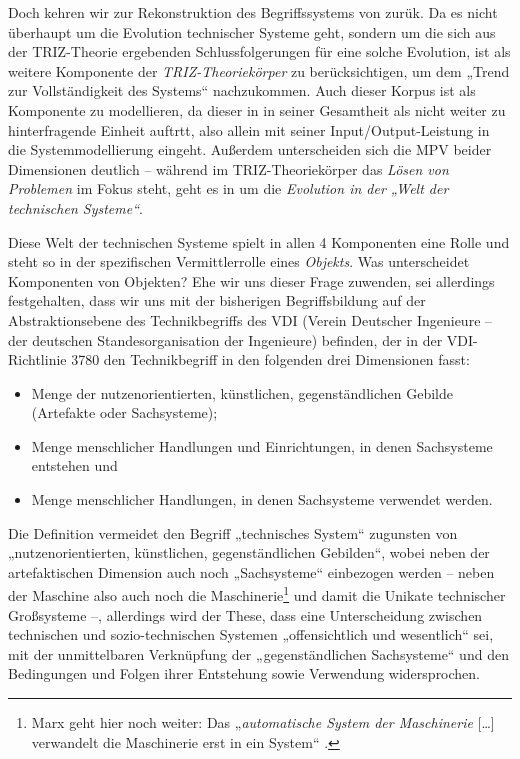 \documentclass[11pt,a4paper]{article}
\begin{document}
Doch kehren wir zur Rekonstruktion des Begriffssystems von \cite{TESE2018}
zurük.  Da es nicht überhaupt um die Evolution technischer Systeme geht,
sondern um die sich aus der TRIZ-Theorie ergebenden Schlussfolgerungen für
eine solche Evolution, ist als weitere Komponente der
\emph{TRIZ-Theoriekörper} zu berücksichtigen, um dem „Trend zur
Vollständigkeit des Systems“ nachzukommen.  Auch dieser Korpus ist als
Komponente zu modellieren, da dieser in \cite{TESE2018} in seiner Gesamtheit
als nicht weiter zu hinterfragende Einheit auftrtt, also allein mit seiner
Input/Output-Leistung in die Systemmodellierung eingeht.  Außerdem
unterscheiden sich die MPV beider Dimensionen deutlich -- während im
TRIZ-Theoriekörper das \emph{Lösen von Problemen} im Fokus steht, geht es in
\cite{TESE2018} um die \emph{Evolution in der „Welt der technischen Systeme“}.

Diese Welt der technischen Systeme spielt in allen 4 Komponenten eine Rolle
und steht so in der spezifischen Vermittlerrolle eines \emph{Objekts}.  Was
unterscheidet Komponenten von Objekten? Ehe wir uns dieser Frage zuwenden, sei
allerdings festgehalten, dass wir uns mit der bisherigen Begriffsbildung auf
der Abstraktionsebene des Technikbegriffs des VDI (Verein Deutscher Ingenieure
-- der deutschen Standesorganisation der Ingenieure) befinden, der in der
VDI-Richtlinie 3780 den Technikbegriff in den folgenden drei Dimensionen
fasst:
\begin{itemize}
\item Menge der nutzenorientierten, künstlichen, gegenständlichen Gebilde
  (Artefakte oder Sachsysteme);
\item Menge menschlicher Handlungen und Einrichtungen, in denen Sachsysteme
  entstehen und
\item Menge menschlicher Handlungen, in denen Sachsysteme verwendet werden.
\end{itemize}
Die Definition vermeidet den Begriff „technisches System“ zugunsten von
„nutzenorientierten, künstlichen, gegenständlichen Gebilden“, wobei neben der
artefaktischen Dimension auch noch „Sachsysteme“ einbezogen werden -- neben
der Maschine also auch noch die Maschinerie\footnote{Marx geht hier noch
  weiter: Das „\emph{automatische System der Maschinerie} [\ldots] verwandelt
  die Maschinerie erst in ein System“ \cite[S. 584]{MEW42}.} und damit die
Unikate technischer Großsysteme --, allerdings wird der These, dass eine
Unterscheidung zwischen technischen und sozio-technischen Systemen
„offensichtlich und wesentlich“ sei, mit der unmittelbaren Verknüpfung der
„gegenständlichen Sachsysteme“ und den Bedingungen und Folgen ihrer Entstehung
sowie Verwendung widersprochen.
\end{document}
